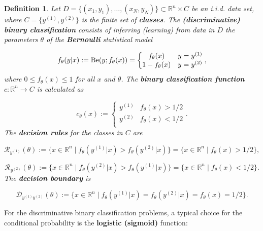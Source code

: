 \documentclass{report}
\newtheorem{definition}{Definition}[chapter]
\begin{document}
\begin{definition}
Let $D = \{(x_1,y_1),\dots,(x_N,y_N)\} \subset \mathbb{R}^n \times C$ be an i.i.d. data set, where $C = \{y^{(1)}, y^{(2)}\}$ is the finite set of \textbf{classes}. The \textbf{(discriminative) binary classification} consists of inferring (learning) from data in $D$ the parameters $\theta$ of the \textbf{Bernoulli} statistical model

\begin{equation}
f_\theta(y|x) := \textup{Be}(y;f_\theta(x)) = \left\{\begin{matrix}
f_\theta(x) & y=y^{(1)}\\
1 - f_\theta(x) & y = y^{(2)} \\
\end{matrix}\right.,
\end{equation}
where $0 \leq f_\theta(x) \leq 1$ for all $x$ and $\theta$. The \textbf{binary classification function} $c : \mathbb{R}^n \to C$ is calculated as

\begin{equation}
c_\theta(x) := \left\{\begin{matrix}
y^{(1)} & f_\theta(x) > 1/2\\
y^{(2)} & f_\theta(x) < 1/2\\
\end{matrix}\right..
\end{equation}
The \textbf{decision rules} for the classes in $C$ are

\begin{equation}
\mathcal{R}_{y^{(1)}}(\theta) := \{x \in \mathbb{R}^n \mid f_\theta(y^{(1)}|x) > f_\theta(y^{(2)}|x)\} = \{x \in \mathbb{R}^n \mid f_\theta(x) > 1/2\},
\end{equation}

\begin{equation}
\mathcal{R}_{y^{(2)}}(\theta) := \{x \in \mathbb{R}^n \mid f_\theta(y^{(2)}|x) > f_\theta(y^{(1)}|x)\} = \{x \in \mathbb{R}^n \mid f_\theta(x) < 1/2\}.
\end{equation}
The \textbf{decision boundary} is

\begin{equation}
\mathcal{D}_{y^{(1)}y^{(2)}}(\theta) := \{x \in \mathbb{R}^n \mid f_\theta(y^{(1)}|x) = f_\theta(y^{(2)}|x) = f_\theta(x) = 1/2\}.
\end{equation}
\end{definition}
For the discriminative binary classification problems, a typical choice for the conditional probability is the \textbf{logistic (sigmoid)} function:
\end{document}
